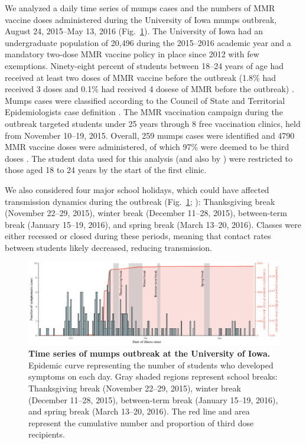 \documentclass[12pt]{article}
\newcommand{\fref}[1]{Fig.~\ref{fig:#1}}
\begin{document}
We analyzed a daily time series of mumps cases and the numbers of MMR vaccine doses administered during the University of Iowa mumps outbreak, August 24, 2015--May 13, 2016 (\fref{data}).
The University of Iowa had an undergraduate population of 20,496 during the 2015--2016 academic year and a mandatory two-dose MMR vaccine policy in place since 2012 with few exemptions.
Ninety-eight percent of students between 18--24 years of age had received at least two doses of MMR vaccine before the outbreak (1.8\% had received 3 doses and 0.1\% had received 4 dosese of MMR before the outbreak) \citep{cardemil2017effectiveness}.
Mumps cases were classified according to the Council of State and Territorial Epidemiologists case definition \citep{casedef}. 
The MMR vaccination campaign during the outbreak targeted students under 25 years through 8 free vaccination clinics, held from November 10--19, 2015. 
Overall, 259 mumps cases were identified and 4790 MMR vaccine doses were administered, of which 97\% were deemed to be third doses \citep{cardemil2017effectiveness}.
The student data used for this analysis (and also by \cite{cardemil2017effectiveness}) were restricted to those aged 18 to 24 years by the start of the first clinic. 

We also considered four major school holidays, which could have affected transmission dynamics during the outbreak (\fref{data}; \cite{iowa}): 
Thanksgiving break (November 22--29, 2015), winter break (December 11--28, 2015), between-term break (January 15--19, 2016), and spring break (March 13--20, 2016).
Classes were either recessed or closed during these periods, meaning that contact rates between students likely decreased, reducing transmission.

\begin{figure}[!th]
\includegraphics[width=\textwidth]{../figure/time_series.pdf}
\caption{
\textbf{Time series of mumps outbreak at the University of Iowa.}
Epidemic curve representing the number of students who developed symptoms on each day.
Gray shaded regions represent school breaks: Thanksgiving break (November 22--29, 2015), winter break (December 11--28, 2015), between-term break (January 15--19, 2016), and spring break (March 13--20, 2016).
The red line and area represent the cumulative number and proportion of third dose recipients.
}
\label{fig:data}
\end{figure}
\end{document}
